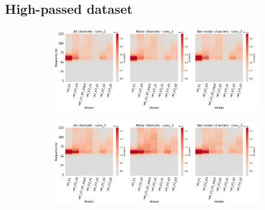 \subsection*{High-passed dataset}\label{subsec:vel-high-passed-dataset-appendixB}
\begin{figure}[!htpb]
\centering
\begin{subfigure}[b]{\textwidth}
   \includegraphics[width=1\linewidth]{img/appendix/A/conv-2/hp-sm/vel-model-gradients_all_kinds}
   \caption{}
   \label{fig:vel-hp-shifted-grads-conv-2}
\end{subfigure}

\begin{subfigure}[b]{\textwidth}
   \includegraphics[width=1\linewidth]{img/appendix/A/conv-3/hp-sm/vel-model-gradients_all_kinds}
   \caption{}
   \label{fig:vel-hp-shifted-grads-conv-3}
\end{subfigure}

\end{figure}
\clearpage   

